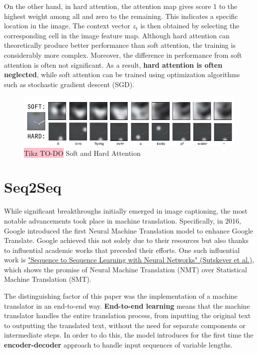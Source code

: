 On the other hand, in hard attention, the attention map gives score 1 to the highest weight among all and zero to the remaining. This indicates a specific location in the image. The context vector $z_t$ is then obtained by selecting the corresponding cell in the image feature map. Although hard attention can theoretically produce better performance than soft attention, the training is considerably more complex. Moreover, the difference in performance from soft attention is often not significant. As a result, \textbf{hard attention is often neglected}, while soft attention can be trained using optimization algorithms such as stochastic gradient descent (SGD).

\begin{figure}[!htbp]
    \centering
    \includegraphics[width=\linewidth]{tikz/chapter7 - Attention Types.png}
    \caption{{\color{red}\colorbox{pink}{Tikz TO-DO}} Soft and Hard Attention}
\end{figure}

\section{Seq2Seq}

While significant breakthroughs initially emerged in image captioning, the most notable advancements took place in machine translation. Specifically, in 2016, Google introduced the first Neural Machine Translation model to enhance Google Translate.  Google achieved this not solely due to their resources but also thanks to influential academic works that preceded their efforts. One such influential work is  \href{https://arxiv.org/pdf/1409.3215}{"Sequence to Sequence Learning with Neural Networks" (Sutskever et al.)}, which shows the promise of Neural Machine Translation (NMT) over Statistical Machine Translation (SMT).

The distinguishing factor of this paper was the implementation of a machine translator in an end-to-end way. \textbf{End-to-end learning} means that the machine translator handles the entire translation process, from inputting the original text to outputting the translated text, without the need for separate components or intermediate steps. In order to do this, the model introduces for the first time the \textbf{encoder-decoder} approach to handle input sequences of variable lengths. 

